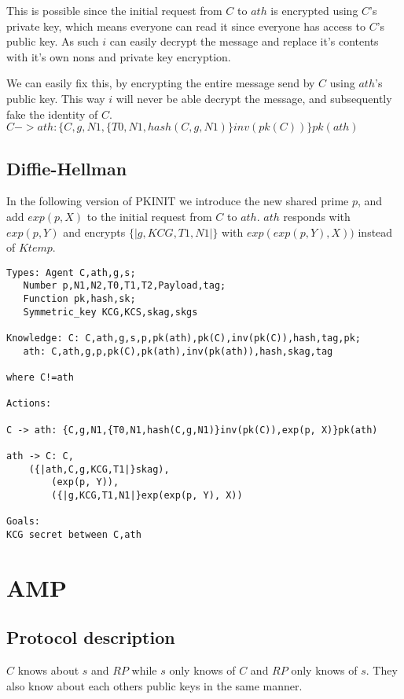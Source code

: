 \documentclass[12pt]{article}
\begin{document}
This is possible since the initial request from $C$ to $ath$ is encrypted using $C$'s private key, which means everyone can read it since everyone has access to $C$'s public key. As such $i$ can easily decrypt the message and replace it's contents with it's own nons and private key encryption.

We can easily fix this, by encrypting the entire message send by $C$ using $ath$'s public key. This way $i$ will never be able decrypt the message, and subsequently fake the identity of $C$.
$C -> ath: \{C,g,N1,\{T0,N1,hash(C,g,N1)\}inv(pk(C))\}pk(ath)$

\subsection{Diffie-Hellman}
\label{sub:Diffie-Hellman}

In the following version of PKINIT we introduce the new shared prime $p$, and add $exp(p, X)$ to the initial request from $C$ to $ath$. $ath$ responds with $exp(p, Y)$ and encrypts $\{|g,KCG,T1,N1|\}$ with $exp(exp(p, Y), X))$ instead of $Ktemp$.\\

\begin{lstlisting}
Types: Agent C,ath,g,s;
   Number p,N1,N2,T0,T1,T2,Payload,tag;
   Function pk,hash,sk;
   Symmetric_key KCG,KCS,skag,skgs

Knowledge: C: C,ath,g,s,p,pk(ath),pk(C),inv(pk(C)),hash,tag,pk;
   ath: C,ath,g,p,pk(C),pk(ath),inv(pk(ath)),hash,skag,tag

where C!=ath

Actions:

C -> ath: {C,g,N1,{T0,N1,hash(C,g,N1)}inv(pk(C)),exp(p, X)}pk(ath)

ath -> C: C,
	({|ath,C,g,KCG,T1|}skag),
        (exp(p, Y)),
        ({|g,KCG,T1,N1|}exp(exp(p, Y), X))

Goals:
KCG secret between C,ath
\end{lstlisting}

\section{AMP}
\label{sec:AMP}

\subsection{Protocol description}
\label{sub:Protocol description}

$C$ knows about $s$ and $RP$ while $s$ only knows of $C$ and $RP$ only knows of $s$. They also know about each others public keys in the same manner.
\end{document}

